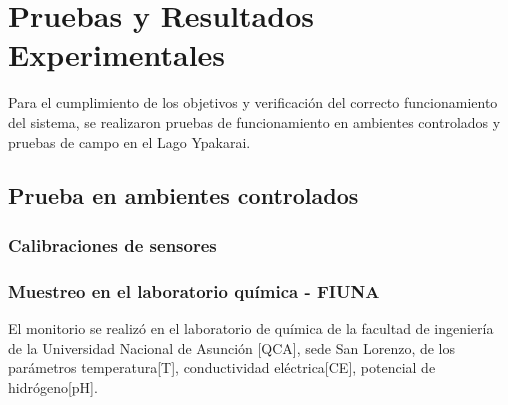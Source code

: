\chapter[Pruebas y Resultados Experimentales]{ Pruebas y Resultados Experimentales}
\pagestyle{fancy}

Para el cumplimiento de los objetivos y verificación del correcto funcionamiento del sistema, se realizaron pruebas de funcionamiento en ambientes controlados y pruebas de campo en el Lago Ypakarai.  
\section{Prueba en ambientes controlados}
\subsection{Calibraciones de sensores}
\subsection{Muestreo en el laboratorio qu\'imica - FIUNA }
El monitorio se realiz\'o en el laboratorio de qu\'imica de la facultad de ingenier\'ia de la Universidad Nacional de Asunci\'on [QCA], sede San Lorenzo, de los par\'ametros temperatura[T], conductividad el\'ectrica[CE], potencial de hidr\'ogeno[pH].

